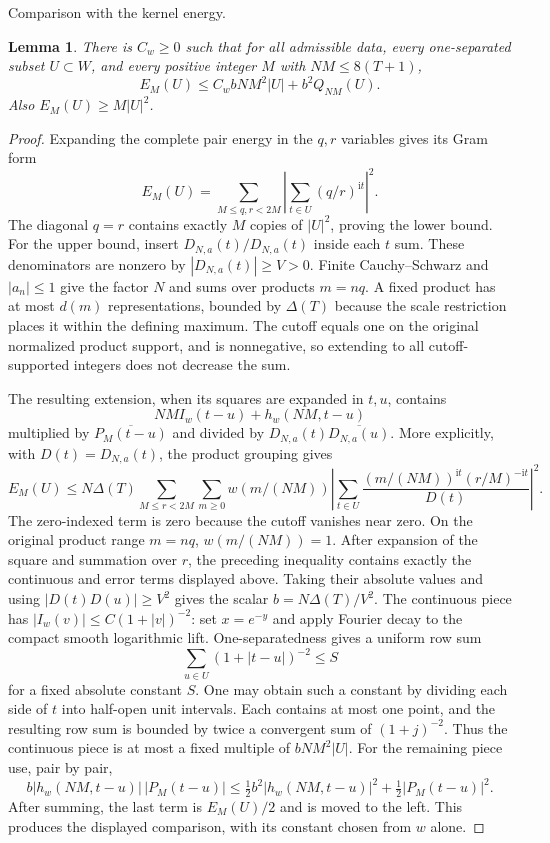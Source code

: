\documentclass[11pt,a4paper]{article}
\numberwithin{equation}{section}
\newtheorem{lemma}[theorem]{Lemma}
\theoremstyle{definition}
\newcommand{\ii}{\mathrm i}
\begin{document}
\par\medskip\noindent Comparison with the kernel energy.
\begin{lemma}\label{lem:comparison}
There is $C_w\ge0$ such that for all admissible data, every one-separated
subset $U\subset W$, and every positive integer $M$ with $NM\le8(T+1)$,
\[
 E_M(U)\le C_w bNM^2|U|+b^2Q_{NM}(U).
\]
Also $E_M(U)\ge M|U|^2$.
\end{lemma}
\begin{proof}
Expanding the complete pair energy in the $q,r$ variables gives its Gram form
\[
 E_M(U)=\sum_{M\le q,r<2M}
 \left|\sum_{t\in U}(q/r)^{\ii t}\right|^2.
\]
The diagonal $q=r$ contains exactly $M$ copies of $|U|^2$, proving the lower
bound. For the upper bound, insert
$D_{N,a}(t)/D_{N,a}(t)$ inside each $t$ sum. These denominators are nonzero by
$|D_{N,a}(t)|\ge V>0$. Finite Cauchy--Schwarz and $|a_n|\le1$ give the
factor $N$ and sums over products $m=nq$. A fixed product has at most $d(m)$
representations, bounded by $\Delta(T)$ because the scale restriction places it
within the defining maximum. The cutoff equals one on the original normalized
product support, and is nonnegative, so extending to all cutoff-supported
integers does not decrease the sum.

The resulting extension, when its squares are expanded in $t,u$, contains
\[
 NM I_w(t-u)+h_w(NM,t-u)
\]
multiplied by $\overline{P_M(t-u)}$ and divided by
$D_{N,a}(t)\overline{D_{N,a}(u)}$. More explicitly, with $D(t)=D_{N,a}(t)$, the product grouping gives
\[
 E_M(U)\le N\Delta(T)
 \sum_{M\le r<2M}\sum_{m\ge0} w(m/(NM))
 \left|\sum_{t\in U}
 \frac{(m/(NM))^{\ii t}(r/M)^{-\ii t}}{D(t)}\right|^2.
\]
The zero-indexed term is zero because the cutoff vanishes near zero.
On the original product range $m=nq$, $w(m/(NM))=1$.
After expansion of the square and summation over $r$, the preceding
inequality contains exactly the continuous and error terms displayed above.
Taking their absolute values and using $|D(t)D(u)|\ge V^2$ gives the
scalar $b=N\Delta(T)/V^2$. The continuous piece has
$|I_w(v)|\le C(1+|v|)^{-2}$: set $x=e^{-y}$ and apply Fourier decay to the
compact smooth logarithmic lift. One-separatedness gives a uniform row sum
\[
 \sum_{u\in U}(1+|t-u|)^{-2}\le S
\]
for a fixed absolute constant $S$. One may obtain such a constant by dividing
each side of $t$ into half-open unit intervals. Each contains at most one
point, and the resulting row sum is bounded by twice a convergent sum of
$(1+j)^{-2}$. Thus the continuous
piece is at most a fixed multiple of $bNM^2|U|$.
For the remaining piece use, pair by pair,
\[
 b|h_w(NM,t-u)|\,|P_M(t-u)|
 \le\tfrac12b^2|h_w(NM,t-u)|^2+\tfrac12|P_M(t-u)|^2.
\]
After summing, the last term is $E_M(U)/2$ and is moved to the left. This
produces the displayed comparison, with its constant chosen from $w$ alone.
\end{proof}
\end{document}
